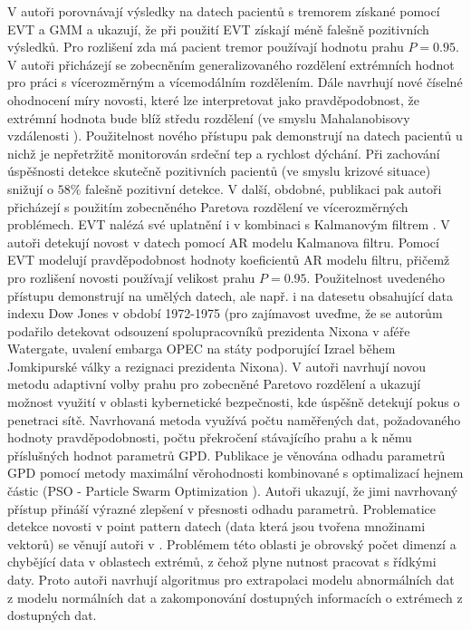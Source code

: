 V \cite{evt1} autoři porovnávají výsledky na datech pacientů s tremorem získané pomocí EVT a GMM a ukazují, že při použití EVT získají méně falešně pozitivních výsledků. Pro rozlišení zda má pacient tremor používají hodnotu prahu $P=0.95$. V \cite{evt3} autoři přicházejí se zobecněním generalizovaného rozdělení extrémních hodnot pro práci s vícerozměrným a vícemodálním rozdělením. Dále navrhují nové číselné ohodnocení míry novosti, které lze interpretovat jako pravděpodobnost, že extrémní hodnota bude blíž středu rozdělení (ve smyslu Mahalanobisovy vzdálenosti \cite{maha}). Použitelnost nového přístupu pak demonstrují na datech pacientů u nichž je nepřetržitě monitorován srdeční tep a rychlost dýchání. Při zachování úspěšnosti detekce skutečně pozitivních pacientů (ve smyslu krizové situace) snižují o $58\%$ falešně pozitivní detekce. V další, obdobné, publikaci \cite{evt5} pak autoři přicházejí s použitím zobecněného Paretova rozdělení  ve vícerozměrných problémech. EVT nalézá své uplatnění i v kombinaci s Kalmanovým filtrem \cite{kalman}. V \cite{evt4} autoři detekují novost v datech pomocí AR modelu Kalmanova filtru. Pomocí EVT modelují pravděpodobnost hodnoty koeficientů AR modelu filtru, přičemž pro rozlišení novosti používají velikost prahu $P=0.95$. Použitelnost uvedeného přístupu demonstrují na umělých datech, ale např. i na datesetu obsahující data indexu Dow Jones v období 1972-1975 (pro zajímavost uveďme, že se autorům podařilo detekovat odsouzení spolupracovníků prezidenta Nixona v aféře Watergate, uvalení embarga OPEC na státy podporující Izrael během Jomkipurské války a rezignaci prezidenta Nixona). V \cite{evt6} autoři navrhují novou metodu  adaptivní volby prahu pro zobecněné Paretovo rozdělení a ukazují možnost využití v oblasti kybernetické bezpečnosti, kde úspěšně detekují pokus o penetraci sítě. Navrhovaná metoda využívá počtu naměřených dat, požadovaného hodnoty pravděpodobnosti, počtu překročení stávajícího prahu a k němu příslušných hodnot parametrů GPD. Publikace \cite{evt7} je věnována odhadu parametrů GPD pomocí metody maximální věrohodnosti kombinované s optimalizací hejnem částic (PSO - Particle Swarm Optimization \cite{pso}). Autoři ukazují, že jimi navrhovaný přístup přináší výrazné zlepšení v přesnosti odhadu parametrů. Problematice detekce novosti v point pattern datech (data která jsou tvořena množinami vektorů) se věnují autoři v \cite{evt8}. Problémem této oblasti je obrovský počet dimenzí a chybějící data v oblastech extrémů, z čehož plyne nutnost pracovat s řídkými daty. Proto autoři navrhují algoritmus pro extrapolaci modelu abnormálních dat z modelu normálních dat a zakomponování dostupných informacích o extrémech z dostupných dat. 



